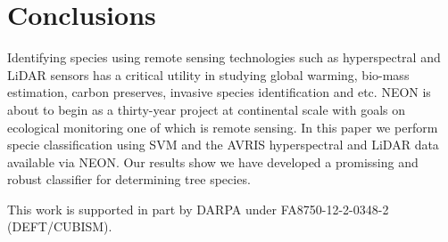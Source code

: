 \documentclass[remotesensing,article,accept,moreauthors,pdftex,12pt,a4paper]{mdpi}
\begin{document}




\section{Conclusions}

Identifying species using remote sensing technologies such as hyperspectral and LiDAR sensors has a critical utility in studying global warming, bio-mass estimation, carbon preserves, invasive species identification and etc. NEON is about to begin as a thirty-year project at continental scale with goals on ecological monitoring one of which is remote sensing. In this paper we perform specie classification using SVM and the AVRIS hyperspectral and LiDAR data available via NEON. Our results show we have developed a promissing and robust classifier for determining tree species. 


This work is supported in part by DARPA under
FA8750-12-2-0348-2 (DEFT/CUBISM).









\end{document}
